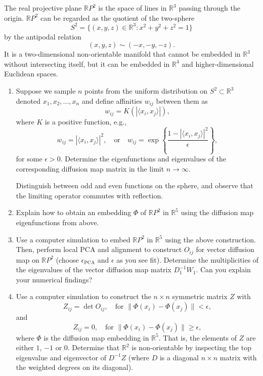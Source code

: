 \begin{myexercise}
The real projective plane $\mathbb{R}P^2$ is the space of lines in $\mathbb{R}^3$ passing through the origin. $\mathbb{R}P^2$ can be regarded as the quotient of the two-sphere $$S^2 = \{(x,y,z) \in \mathbb R^3 : x^2+y^2+z^2 = 1\}$$ by the antipodal relation $$(x,y,z)\sim (-x,-y,-z).$$ It is a two-dimensional non-orientable manifold that cannot be embedded in $\mathbb{R}^3$ without intersecting itself, but it can be embedded in $\mathbb{R}^4$ and higher-dimensional Euclidean spaces.
\begin{enumerate}
\item Suppose we sample $n$ points from the uniform distribution on $S^2 \subset \mathbb{R}^3$ denoted $x_1,x_2,\ldots,x_n$ and define affinities $w_{ij}$ between them as
$$w_{ij} = K(|\langle x_i , x_j \rangle |),$$
where $K$ is a positive function, e.g., $$w_{ij} = |\langle x_i , x_j \rangle |^2, \quad \mbox{or} \quad w_{ij} = \exp\left\{\frac{1-|\langle x_i , x_j \rangle |^2}{\epsilon}\right\},$$ for some $\epsilon>0$. Determine the eigenfunctions and eigenvalues of the corresponding diffusion map matrix in the limit $n\to \infty$. 
\begin{hint}Distinguish between odd and even functions on the sphere, and observe that the limiting operator commutes with reflection.
\end{hint}

\item Explain how to obtain an embedding $\Phi$ of $\mathbb{R}P^2$ in $\mathbb{R}^5$ using the diffusion map eigenfunctions from above.

\item Use a computer simulation to embed $\mathbb{R}P^2$ in $\mathbb{R}^5$ using the above construction. Then, perform local PCA and alignment to construct $O_{ij}$ for vector diffusion map on $\mathbb{R}P^2$ (choose $\epsilon_{\text{PCA}}$ and $\epsilon$ as you see fit). Determine the multiplicities of the eigenvalues of the vector diffusion map matrix $D_1^{-1}W_1$. Can you explain your numerical findings?

\item Use a computer simulation to construct the $n\times n$ symmetric matrix $Z$ with
$$Z_{ij} = \det O_{ij}, \quad \mbox{for } \|\Phi(x_i)-\Phi(x_j)\| < \epsilon,$$
and
$$Z_{ij} = 0, \quad \mbox{for } \|\Phi(x_i)-\Phi(x_j)\| \geq \epsilon,$$
where $\Phi$ is the diffusion map embedding in $\mathbb{R}^5$. That is, the elements of $Z$ are either $1$, $-1$ or $0$.
Determine that $\mathbb{R}^2$ is non-orientable by inspecting the top eigenvalue and eigenvector of $D^{-1}Z$ (where $D$ is a diagonal $n\times n$ matrix with the weighted degrees on its diagonal).


\end{enumerate}
\end{myexercise}
